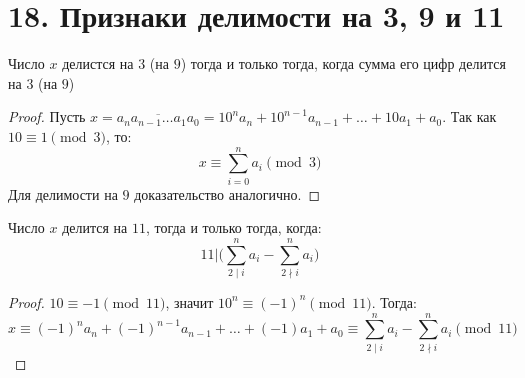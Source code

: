 \documentclass[a4paper,12pt]{article}
\begin{document}
		\section*{18. Признаки делимости на 3, 9 и 11}

        Число $x$ делистся на $3$ (на $9$) тогда и только тогда, когда сумма его цифр делится на $3$ (на $9$)
        \begin{proof}
            Пусть $x = \overline{a_{n}a_{n - 1}\ldots a_{1}a_{0}} = 10^{n}a_{n} + 10^{n - 1}a_{n - 1} + \ldots + 10a_{1} + a_{0}$. Так как\\
            $10 \equiv 1 \pmod 3$, то:
            \[
                x \equiv \sum_{i = 0}^{n} a_{i} \pmod 3
            \]
            Для делимости на $9$ доказательство аналогично.
        \end{proof}
        Число $x$ делится на $11$, тогда и только тогда, когда:
        \[
        	11 | \bigg(\sum_{2 \mid i}^{n} a_{i} - \sum_{2 \nmid i}^{n} a_{i}\bigg)
        \]
        \begin{proof}
        	$10 \equiv -1 \pmod{11}$, значит $10^{n} \equiv (-1)^{n} \pmod{11}$. Тогда:
        	\[
        		x \equiv (-1)^{n}a_{n} + (-1)^{n - 1}a_{n - 1} + \ldots + (-1)a_{1} + a_{0} \equiv \sum_{2 \mid i}^{n} a_{i} - \sum_{2 \nmid i}^{n} a_{i} \pmod{11}
        	\]
        \end{proof}
\end{document}
